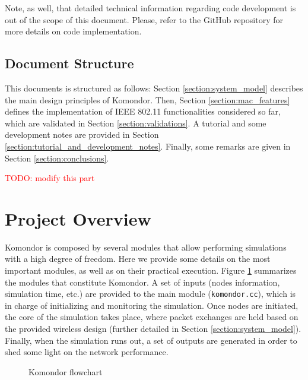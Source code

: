 \documentclass[a4paper]{article}
\begin{document}
	Note, as well, that detailed technical information regarding code development is out of the scope of this document. Please, refer to the GitHub repository for more details on code implementation.
	
	\subsection{Document Structure}
	\label{section:structure}
	This documents is structured as follows: Section \ref{section:system_model} describes the main design principles of Komondor. Then, Section \ref{section:mac_features} defines the implementation of IEEE 802.11 functionalities considered so far, which are validated in Section \ref{section:validations}. A tutorial and some development notes are provided in Section \ref{section:tutorial_and_development_notes}. Finally, some remarks are given in Section \ref{section:conclusions}.
	
	\textcolor{red}{TODO: modify this part}
	
\section{Project Overview}
\label{section:project_overview}

Komondor is composed by several modules that allow performing simulations with a high degree of freedom. Here we provide some details on the most important modules, as well as on their practical execution. Figure \ref{fig:komondor_flowchart} summarizes the modules that constitute Komondor. A set of inputs (nodes information, simulation time, etc.) are provided to the main module (\texttt{komondor.cc}), which is in charge of initializing and monitoring the simulation. Once nodes are initiated, the core of the simulation takes place, where packet exchanges are held based on the provided wireless design (further detailed in Section \ref{section:system_model}). Finally, when the simulation runs out, a set of outputs are generated in order to shed some light on the network performance.
\begin{figure}[h!]
	\centering
	\caption{Komondor flowchart}
	\label{fig:komondor_flowchart}
\end{figure}		

\end{document}
